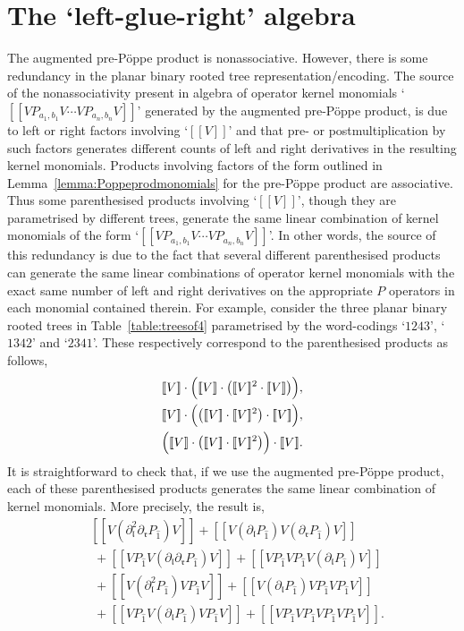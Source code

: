\documentclass[5p,twocolumn]{elsarticle}
\newcommand*{\pa}{{\partial}}
\newcommand*{\lb}{[\![}
\newcommand*{\rb}{]\!]}
\newcommand*{\el}{\mathfrak l}
\newcommand*{\rl}{\mathfrak r}
\begin{document}
\section{The `left-glue-right' algebra}\label{sec:lgr-alg}
The augmented pre-P\"oppe product is nonassociative. However, there is some redundancy in the planar binary rooted tree representation/encoding.
The source of the nonassociativity present in algebra of operator kernel monomials `$\lb VP_{a_1,b_1}V\cdots VP_{a_n,b_n}V\rb$' generated by the augmented pre-P\"oppe product,
is due to left or right factors involving `$\lb V\rb$' and that pre- or postmultiplication by such factors generates different counts of left and right derivatives in the resulting kernel monomials.
Products involving factors of the form outlined in Lemma~\ref{lemma:Poppeprodmonomials} for the pre-P\"oppe product are associative.
Thus some parenthesised products involving `$\lb V\rb$', though they are parametrised by different trees, generate the same linear combination of kernel monomials of the form `$\lb VP_{a_1,b_1}V\cdots VP_{a_n,b_n}V\rb$'.
In other words, the source of this redundancy is due to the fact that several different parenthesised products can 
generate the same linear combinations of operator kernel monomials with the exact same number of left and right derivatives on the appropriate $P$ operators in each monomial contained therein. 
For example, consider the three planar binary rooted trees in Table~\ref{table:treesof4} parametrised by the word-codings `$1243$', `$1342$' and `$2341$'.
These respectively correspond to the parenthesised products as follows,
\begin{align*}
  &\lb V\rb\cdot\Bigl(\lb V\rb\cdot\bigl(\lb V\rb^2\cdot\lb V\rb\bigr)\Bigr),\\
  &\lb V\rb\cdot\Bigl(\bigl(\lb V\rb\cdot\lb V\rb^2\bigr)\cdot\lb V\rb\Bigr),\\
  &\Bigl(\lb V\rb\cdot\bigl(\lb V\rb\cdot\lb V\rb^2\bigr)\Bigr)\cdot\lb V\rb.
\end{align*}
It is straightforward to check that, if we use the augmented pre-P\"oppe product, each of these parenthesised products generates the same linear combination of kernel monomials.
More precisely, the result is, 
\begin{align}
  &\lb V(\pa_{\el}^2\pa_{\rl}P_{\hat 1})V\rb+\lb V(\pa_{\el}P_{\hat 1})V(\pa_{\rl}P_{\hat 1})V\rb\nonumber\\
  &\;+\lb VP_{\hat 1}V(\pa_{\el}\pa_{\rl}P_{\hat 1})V\rb+\lb VP_{\hat 1} VP_{\hat 1}V(\pa_{\el}P_{\hat 1})V\rb\nonumber\\
  &\;+\lb V(\pa_{\el}^2P_{\hat 1})VP_{\hat 1}V\rb+\lb V(\pa_{\el}P_{\hat 1})VP_{\hat 1} VP_{\hat 1}V\rb\nonumber\\
  &\;+\lb VP_{\hat 1}V(\pa_{\el}P_{\hat 1}) VP_{\hat 1}V\rb+\lb VP_{\hat 1}VP_{\hat 1}VP_{\hat 1}VP_{\hat 1}V\rb.\label{eq:seqexp}
\end{align}
\end{document}
